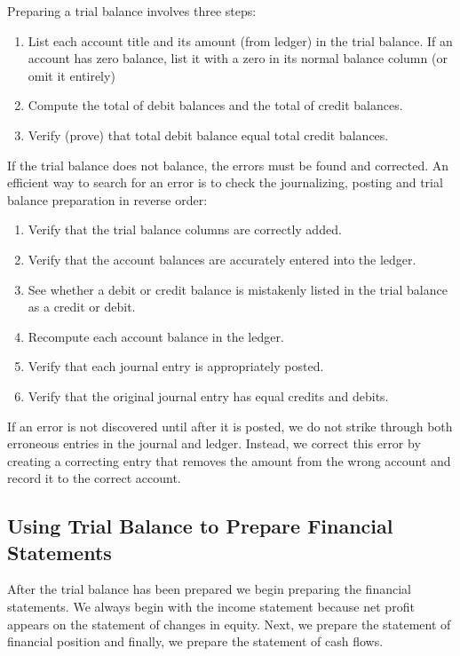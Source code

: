 \documentclass[../main.tex]{subfiles}
\begin{document}
	Preparing a trial balance involves three steps:
	\begin{enumerate}[noitemsep]
		\item List each account title and its amount (from ledger) in the trial 
		balance. If an account has zero balance, list it with a zero in its 
		normal balance column (or omit it entirely)
		\item Compute the total of debit balances and the total of credit 
		balances.
		\item Verify (prove) that total debit balance equal total credit 
		balances. 
	\end{enumerate}
	
	If the trial balance does not balance, the errors must be found and 
	corrected. An efficient way to search for an error is to check the 
	journalizing, posting and trial balance preparation in reverse order:
	\begin{enumerate}[noitemsep]
		\item Verify that the trial balance columns are correctly added.
		\item Verify that the account balances are accurately entered into the 
		ledger.
		\item See whether a debit or credit balance is mistakenly listed in the 
		trial balance as a credit or debit. 
		\item Recompute each account balance in the ledger. 
		\item Verify that each journal entry is appropriately posted. 
		\item Verify that the original journal entry has equal credits and 
		debits. 
	\end{enumerate}
	
	If an error is not discovered until after it is posted, we do not strike 
	through both erroneous entries in the journal and ledger. Instead, we 
	correct this error by creating a correcting entry that removes the amount 
	from the wrong account and record it to the correct account. 
	
	\subsection{Using Trial Balance to Prepare Financial Statements}
	
	After the trial balance has been prepared we begin preparing the financial 
	statements. We always begin with the income statement because net profit 
	appears on the statement of changes in equity. Next, we prepare the 
	statement of financial position and finally, we prepare the statement of 
	cash flows.
	
\end{document}
